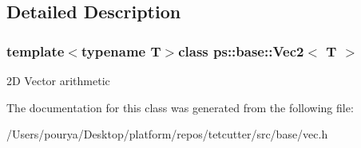 \subsection{Detailed Description}
\subsubsection*{template$<$typename T$>$class ps\+::base\+::\+Vec2$<$ T $>$}

2\+D Vector arithmetic 

The documentation for this class was generated from the following file\+:\begin{DoxyCompactItemize}
\item 
/\+Users/pourya/\+Desktop/platform/repos/tetcutter/src/base/vec.\+h\end{DoxyCompactItemize}
